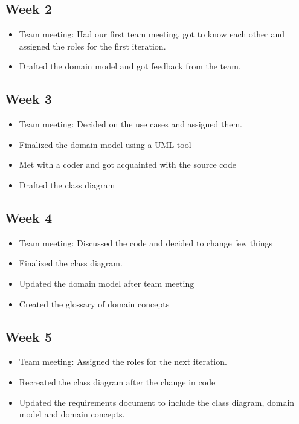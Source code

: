\documentclass[12pt]{article}
\begin{document}
\maketitle

\subsection*{Week 2}

\begin{itemize}
    \item Team meeting: Had our first team meeting, got to know each other and assigned the roles for the first iteration.
    \item Drafted the domain model and got feedback from the team.
\end{itemize}

\subsection*{Week 3}

\begin{itemize}
    \item Team meeting: Decided on the use cases and assigned them.
    \item Finalized the domain model using a UML tool
    \item Met with a coder and got acquainted with the source code
    \item Drafted the class diagram

\end{itemize}

\subsection*{Week 4}

\begin{itemize}
    \item Team meeting: Discussed the code and decided to change few things
    \item Finalized the class diagram.
    \item Updated the domain model after team meeting
    \item Created the glossary of domain concepts

\end{itemize}
\subsection*{Week 5}

\begin{itemize}
    \item Team meeting: Assigned the roles for the next iteration.
    \item Recreated the class diagram after the change in code
    \item Updated the requirements document to include the class diagram, domain model and domain concepts.

\end{itemize}
\end{document}
